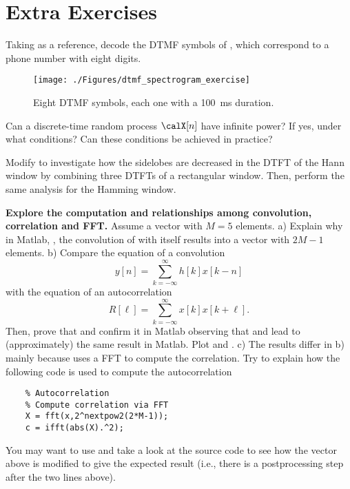 \section{Extra Exercises}
\begin{exercises}

\item Taking  as a reference, decode the DTMF symbols of 
, which correspond to a phone number with eight digits.
\begin{figure}[htbp]
\centering
\texttt{[image: ./Figures/dtmf\_spectrogram\_exercise]}
\caption{Eight DTMF symbols, each one with a 100~ms duration.\label{fig:dtmf_spectrogram_exercise}}
\end{figure}

\item Can a discrete-time random process $\calX[n]$ have infinite power? If yes, under what conditions? Can these conditions be achieved in practice?

\item Modify  to investigate how the sidelobes are decreased in the DTFT of the Hann window by combining three DTFTs of a rectangular window. 
Then, perform the same analysis for the Hamming window.

\item \textbf{Explore the computation and relationships among convolution, correlation and
FFT.}
Assume a vector  with $M=5$ elements. a) Explain
why in Matlab, , the convolution of  with
 itself results into a vector with $2M-1$ elements. b)
Compare the equation of a convolution 
$$y[n]=\sum_{k=-\infty}^\infty h[k] x[k-n]$$
with the equation of an autocorrelation
$$R[\ell]=\sum_{k=-\infty}^\infty x[k] x[k+\ell].$$
Then, prove that  and confirm it in
Matlab observing that  and 
lead to (approximately) the same result in Matlab. Plot
 and . c) The results differ in b)
mainly because  uses a FFT to compute the correlation.
Try to explain how the following code is used to compute the
autocorrelation
\begin{verbatim}
    % Autocorrelation
    % Compute correlation via FFT
    X = fft(x,2^nextpow2(2*M-1));
    c = ifft(abs(X).^2);
\end{verbatim}
You may want to use  and take a look at the source
code to see how the vector  above is modified to give the
expected result (i.e., there is a postprocessing step after the
two lines above).


\end{exercises}
